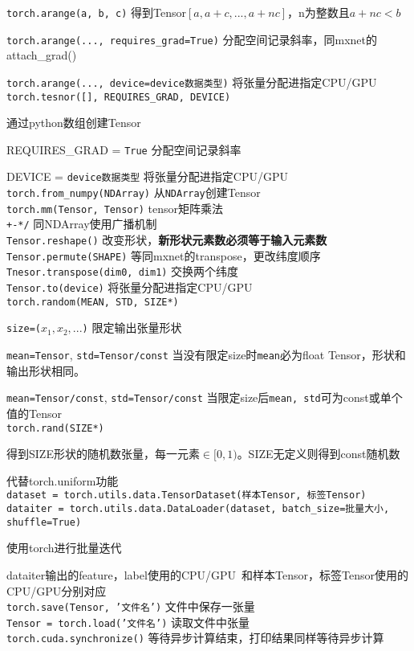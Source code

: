 \documentclass[UTF8]{ctexart}
\begin{document}
  \texttt{torch.arange(a, b, c)} 得到Tensor$[a, a+c, ..., a+nc]$，n为整数且$a+nc < b$
  
  \texttt{torch.arange(..., requires\_grad=True)} 分配空间记录斜率，同mxnet的attach\_grad()
  
  \texttt{torch.arange(..., device=device数据类型)} 将张量分配进指定CPU/GPU\\
\texttt{torch.tesnor([], REQUIRES\_GRAD, DEVICE)}
  
  通过python数组创建Tensor

  REQUIRES\_GRAD = \texttt{True} 分配空间记录斜率
  
  DEVICE = \texttt{device数据类型} 将张量分配进指定CPU/GPU\\
\texttt{torch.from\_numpy(NDArray)} 从\texttt{NDArray}创建Tensor\\
\texttt{torch.mm(Tensor, Tensor)} tensor矩阵乘法\\
\texttt{+-*/} 同NDArray使用广播机制\\
\texttt{Tensor.reshape()} 改变形状，\textbf{新形状元素数必须等于输入元素数}\\
\texttt{Tensor.permute(SHAPE)} 等同mxnet的transpose，更改纬度顺序\\
\texttt{Tnesor.transpose(dim0, dim1)} 交换两个纬度\\
\texttt{Tensor.to(device)} 将张量分配进指定CPU/GPU\\
\texttt{torch.random(MEAN, STD, SIZE*)}

  \texttt{size=($x_1, x_2, ...$)} 限定输出张量形状

  \texttt{mean=Tensor}, \texttt{std=Tensor/const} 当没有限定size时\texttt{mean}必为float Tensor，形状和输出形状相同。

  \texttt{mean=Tensor/const}, \texttt{std=Tensor/const} 当限定size后\texttt{mean, std}可为const或单个值的Tensor\\
\texttt{torch.rand(SIZE*)}

  得到SIZE形状的随机数张量，每一元素$\in [0,1)$。SIZE无定义则得到const随机数

  代替torch.uniform功能\\
\texttt{dataset = torch.utils.data.TensorDataset(样本Tensor, 标签Tensor)}\\
\texttt{dataiter = torch.utils.data.DataLoader(dataset, batch\_size=批量大小, shuffle=True)}

  使用torch进行批量迭代
  
  dataiter输出的feature，label使用的CPU/GPU\ 和样本Tensor，标签Tensor使用的CPU/GPU分别对应\\
\texttt{torch.save(Tensor, '文件名')} 文件中保存一张量\\
\texttt{Tensor = torch.load('文件名')} 读取文件中张量\\
\texttt{torch.cuda.synchronize()} 等待异步计算结束，打印结果同样等待异步计算
\end{document}
